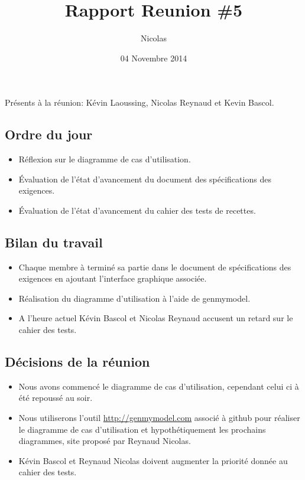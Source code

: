 \documentclass{article}
\title{Rapport Reunion \#5}
\author{Nicolas \bsc{Reynaud}}
\date{04 Novembre 2014}
\begin{document}
\maketitle
\newpage

Présents à la réunion: Kévin Laoussing, Nicolas Reynaud et Kevin Bascol.

\subsection*{Ordre du jour}
	\begin{itemize}
		\item Réflexion sur le diagramme de cas d'utilisation.
		\item Évaluation de l'état d'avancement du document des spécifications des exigences.
		\item Évaluation de l'état d'avancement du cahier des tests de recettes.
	\end{itemize}

\subsection*{Bilan du travail}
	\begin{itemize}
		\item Chaque membre à terminé sa partie dans le document de spécifications des exigences en ajoutant l'interface graphique associée.
		\item Réalisation du diagramme d'utilisation à l'aide de genmymodel.
		\item A l'heure actuel Kévin Bascol et Nicolas Reynaud accusent un retard sur le cahier des tests.
	\end{itemize}
	
\subsection*{Décisions de la réunion}
	\begin{itemize}
		\item Nous avons commencé le diagramme de cas d'utilisation, cependant celui ci à été repoussé au soir.
		\item Nous utiliserons l'outil \url{http://genmymodel.com} associé à github pour réaliser le diagramme de cas d'utilisation et hypothétiquement les prochains diagrammes, site proposé par Reynaud Nicolas.
		\item Kévin Bascol et Reynaud Nicolas doivent augmenter la priorité donnée au cahier des tests.
	\end{itemize}
	
\end{document}
